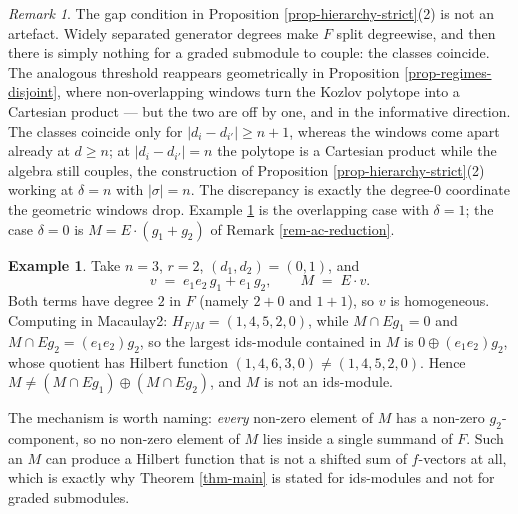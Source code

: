 \documentclass[11pt, a4paper, abstract=yes]{scrartcl}
\theoremstyle{definition}
\newtheorem{mexample}[definition]{Example}
\theoremstyle{remark}
\newtheorem{remark}[definition]{Remark}
\theoremstyle{plain}
\begin{document}
\begin{remark}
The gap condition in Proposition \ref{prop-hierarchy-strict}(2) is not an artefact. Widely separated
generator degrees make \(F\) split degreewise, and then there is simply nothing for a graded
submodule to couple: the classes coincide. The analogous threshold
reappears geometrically in Proposition \ref{prop-regimes-disjoint}, where non-overlapping windows turn
the Kozlov polytope into a Cartesian product --- but the two are off by one, and in the informative
direction. The classes coincide only for \(\lvert d_i-d_{i'}\rvert\ge n+1\), whereas the windows come
apart already at \(d\ge n\); at \(\lvert d_i-d_{i'}\rvert=n\) the polytope is a Cartesian product
while the algebra still couples, the construction of
Proposition \ref{prop-hierarchy-strict}(2) working at \(\delta=n\) with \(\lvert\sigma\rvert=n\). The
discrepancy is exactly the degree-\(0\) coordinate the geometric windows drop. Example \ref{ex-nonids} is the overlapping case with
\(\delta=1\); the case \(\delta=0\) is \(M=E\cdot(g_1+g_2)\) of Remark \ref{rem-ac-reduction}.
\label{rem-hierarchy-gaps}
\end{remark}

\begin{mexample}
Take \(n=3\), \(r=2\), \((d_1,d_2)=(0,1)\), and
\begin{equation}\label{eq:nonids}
  v\;=\;e_1e_2\,g_1+e_1\,g_2,\qquad M\;=\;E\cdot v .
\end{equation}
Both terms have degree \(2\) in \(F\) (namely \(2+0\) and \(1+1\)), so \(v\) is homogeneous.
Computing in Macaulay2: \(H_{F/M}=(1,4,5,2,0)\), while \(M\cap Eg_1=0\) and
\(M\cap Eg_2=(e_1e_2)g_2\), so the largest ids-module contained in \(M\) is
\(0\oplus(e_1e_2)g_2\), whose quotient has Hilbert function \((1,4,6,3,0)\ne(1,4,5,2,0)\). Hence
\(M\ne(M\cap Eg_1)\oplus(M\cap Eg_2)\), and \(M\) is not an ids-module.
\label{ex-nonids}
\end{mexample}

The mechanism is worth naming: \emph{every} non-zero element of \(M\) has a non-zero \(g_2\)-component, so
no non-zero element of \(M\) lies inside a single summand of \(F\). Such an \(M\) can produce a
Hilbert function that is not a shifted sum of \(f\)-vectors at all, which is exactly why
Theorem \ref{thm-main} is stated for ids-modules and not for graded submodules.
\end{document}
